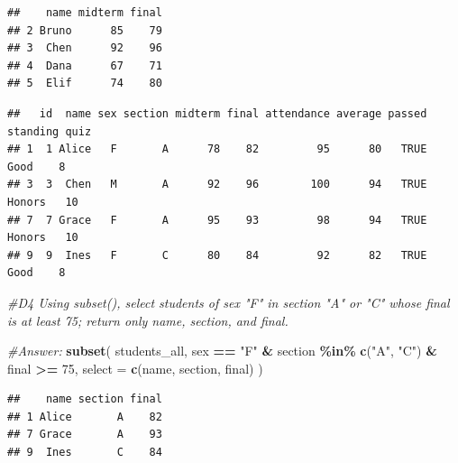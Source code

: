 \documentclass[
]{article}
\newenvironment{Shaded}{\begin{snugshade}}{\end{snugshade}}
\newcommand{\AttributeTok}[1]{\textcolor[rgb]{0.13,0.29,0.53}{#1}}
\newcommand{\CommentTok}[1]{\textcolor[rgb]{0.56,0.35,0.01}{\textit{#1}}}
\newcommand{\DecValTok}[1]{\textcolor[rgb]{0.00,0.00,0.81}{#1}}
\newcommand{\FunctionTok}[1]{\textcolor[rgb]{0.13,0.29,0.53}{\textbf{#1}}}
\newcommand{\NormalTok}[1]{#1}
\newcommand{\SpecialCharTok}[1]{\textcolor[rgb]{0.81,0.36,0.00}{\textbf{#1}}}
\newcommand{\StringTok}[1]{\textcolor[rgb]{0.31,0.60,0.02}{#1}}
\begin{document}
\begin{verbatim}
##    name midterm final
## 2 Bruno      85    79
## 3  Chen      92    96
## 4  Dana      67    71
## 5  Elif      74    80
\end{verbatim}

\begin{Shaded}
\end{Shaded}

\begin{verbatim}
##   id  name sex section midterm final attendance average passed standing quiz
## 1  1 Alice   F       A      78    82         95      80   TRUE     Good    8
## 3  3  Chen   M       A      92    96        100      94   TRUE   Honors   10
## 7  7 Grace   F       A      95    93         98      94   TRUE   Honors   10
## 9  9  Ines   F       C      80    84         92      82   TRUE     Good    8
\end{verbatim}

\begin{Shaded}
\begin{Highlighting}[]
\CommentTok{\#D4 Using subset(), select students of sex "F" in section "A" or "C" whose final is at least 75; return only name, section, and final.}

\CommentTok{\#Answer:}
\FunctionTok{subset}\NormalTok{(}
\NormalTok{  students\_all,}
\NormalTok{  sex }\SpecialCharTok{==} \StringTok{"F"} \SpecialCharTok{\&}
\NormalTok{  section }\SpecialCharTok{\%in\%} \FunctionTok{c}\NormalTok{(}\StringTok{"A"}\NormalTok{, }\StringTok{"C"}\NormalTok{) }\SpecialCharTok{\&}
\NormalTok{  final }\SpecialCharTok{\textgreater{}=} \DecValTok{75}\NormalTok{,}
  \AttributeTok{select =} \FunctionTok{c}\NormalTok{(name, section, final)}
\NormalTok{)}
\end{Highlighting}
\end{Shaded}

\begin{verbatim}
##    name section final
## 1 Alice       A    82
## 7 Grace       A    93
## 9  Ines       C    84
\end{verbatim}
\end{document}

